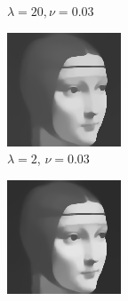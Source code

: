 \documentclass[abstracton]{scrreprt}
\begin{document}
\begin{figure}[!ht]
\begin{subfigure}[b]{0.24\textwidth}
                    \caption{$\lambda = 20, \nu = 0.03$}
                \end{subfigure}
                \begin{subfigure}[b]{0.24\textwidth}
                    \includegraphics[width=\textwidth]{img/approximation/02ladama002.png}
                    \caption{$\lambda = 2$, $\nu = 0.03$}
                \end{subfigure}
                \begin{subfigure}[b]{0.24\textwidth}
                    \includegraphics[width=\textwidth]{img/approximation/01ladama001.png}

\end{subfigure}
\end{figure}
\end{document}

